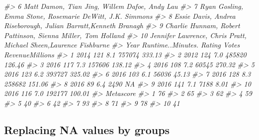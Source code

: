 \documentclass[
]{book}
\newenvironment{Shaded}{\begin{snugshade}}{\end{snugshade}}
\newcommand{\CommentTok}[1]{\textcolor[rgb]{0.56,0.35,0.01}{\textit{#1}}}
\begin{document}
\begin{Shaded}
\begin{Highlighting}[]
\CommentTok{\#\textgreater{} 6                               Matt Damon, Tian Jing, Willem Dafoe, Andy Lau}
\CommentTok{\#\textgreater{} 7                    Ryan Gosling, Emma Stone, Rosemarie DeWitt, J.K. Simmons}
\CommentTok{\#\textgreater{} 8             Essie Davis, Andrea Riseborough, Julian Barratt,Kenneth Branagh}
\CommentTok{\#\textgreater{} 9                Charlie Hunnam, Robert Pattinson, Sienna Miller, Tom Holland}
\CommentTok{\#\textgreater{} 10           Jennifer Lawrence, Chris Pratt, Michael Sheen,Laurence Fishburne}
\CommentTok{\#\textgreater{}    Year Runtime..Minutes. Rating  Votes RevenueMillions}
\CommentTok{\#\textgreater{} 1  2014               121    8.1 757074          333.13}
\CommentTok{\#\textgreater{} 2  2012               124    7.0 485820          126.46}
\CommentTok{\#\textgreater{} 3  2016               117    7.3 157606          138.12}
\CommentTok{\#\textgreater{} 4  2016               108    7.2  60545          270.32}
\CommentTok{\#\textgreater{} 5  2016               123    6.2 393727          325.02}
\CommentTok{\#\textgreater{} 6  2016               103    6.1  56036           45.13}
\CommentTok{\#\textgreater{} 7  2016               128    8.3 258682          151.06}
\CommentTok{\#\textgreater{} 8  2016                89    6.4   2490              NA}
\CommentTok{\#\textgreater{} 9  2016               141    7.1   7188            8.01}
\CommentTok{\#\textgreater{} 10 2016               116    7.0 192177          100.01}
\CommentTok{\#\textgreater{}    Metascore}
\CommentTok{\#\textgreater{} 1         76}
\CommentTok{\#\textgreater{} 2         65}
\CommentTok{\#\textgreater{} 3         62}
\CommentTok{\#\textgreater{} 4         59}
\CommentTok{\#\textgreater{} 5         40}
\CommentTok{\#\textgreater{} 6         42}
\CommentTok{\#\textgreater{} 7         93}
\CommentTok{\#\textgreater{} 8         71}
\CommentTok{\#\textgreater{} 9         78}
\CommentTok{\#\textgreater{} 10        41}
\end{Highlighting}
\end{Shaded}

\hypertarget{replacing-na-values-by-groups}{%
\subsection{Replacing NA values by groups}\label{replacing-na-values-by-groups}}
\end{document}

